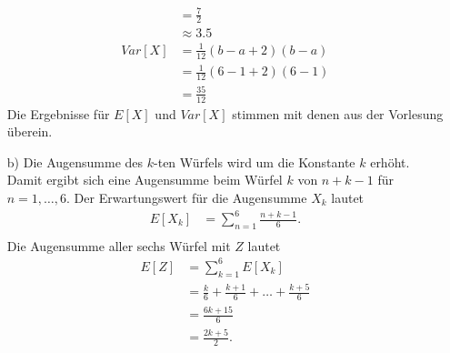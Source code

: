 \begin{enumerate}
\begin{equation*}
\begin{split}
								&= \frac{7}{2}\\
								&\approx 3.5\\
			Var[X]				&= \frac{1}{12}(b-a+2)(b-a)\\
								&= \frac{1}{12}(6-1+2)(6-1)\\
								&= \frac{35}{12}
		\end{split}
	\end{equation*}
	Die Ergebnisse für $E[X]$ und $Var[X]$ stimmen mit denen aus der Vorlesung überein. 
\item[b)] Die Augensumme des $k$-ten Würfels wird um die Konstante $k$ erhöht. Damit ergibt sich eine Augensumme beim Würfel $k$ von $n+k-1$ für $n={1,\dots,6}$. Der Erwartungswert für die Augensumme $X_k$ lautet
	\begin{equation*}
		\begin{split}
			E[X_k]				&= \sum_{n=1}^{6} \frac{n+k-1}{6}.\\
		\end{split}
	\end{equation*}
Die Augensumme aller sechs Würfel mit $Z$ lautet
	\begin{equation*}
		\begin{split}
			E[Z]				&= \sum_{k=1}^{6} E[X_k]\\
								&= \frac{k}{6} + \frac{k+1}{6} + \dots + \frac{k+5}{6}\\
								&= \frac{6k+15}{6}\\
								&= \frac{2k+5}{2}.
		\end{split}
	\end{equation*}
\end{enumerate}